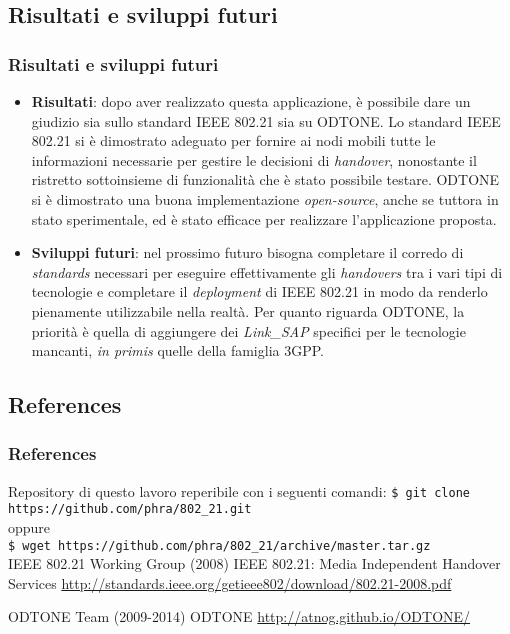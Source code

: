 \documentclass[10pt]{beamer}
\newcommand{\cmduser}[1]{\texttt{\$ #1}\\}
\begin{document}
\subsection{Risultati e sviluppi futuri}
\begin{frame}
\frametitle{Risultati e sviluppi futuri}
\begin{itemize}
\item \textbf{Risultati}: dopo aver realizzato questa applicazione, è possibile dare un giudizio sia sullo standard IEEE 802.21 sia su ODTONE. Lo standard IEEE 802.21 si è dimostrato adeguato per fornire ai nodi mobili tutte le informazioni necessarie per gestire le decisioni di {\em handover}, nonostante il ristretto sottoinsieme di funzionalità che è stato possibile testare. ODTONE si è dimostrato una buona implementazione {\em open-source}, anche se tuttora in stato sperimentale, ed è stato efficace per realizzare l'applicazione proposta. 
\item \textbf{Sviluppi futuri}: nel prossimo futuro bisogna completare il corredo di {\em standards} necessari per eseguire effettivamente gli {\em handovers} tra i vari tipi di tecnologie e completare il {\em deployment} di IEEE 802.21 in modo da renderlo pienamente utilizzabile nella realtà.
Per quanto riguarda ODTONE, la priorità è quella di aggiungere dei {\em Link\_SAP} specifici per le tecnologie mancanti, {\em in primis} quelle della famiglia 3GPP.
\end{itemize}
\end{frame}

\subsection{References}
\begin{frame}
\frametitle{References}
\footnotesize{
\begin{thebibliography}{99} %

 Repository di questo lavoro reperibile con i seguenti comandi:
\newblock \cmduser{git clone https://github.com/phra/802\_21.git}
oppure\\
\cmduser{wget https://github.com/phra/802\_21/archive/master.tar.gz}
\vspace{2em}
 IEEE 802.21 Working Group (2008)
\newblock IEEE 802.21: Media Independent Handover Services
\newblock \url{http://standards.ieee.org/getieee802/download/802.21-2008.pdf}

 ODTONE Team (2009-2014)
\newblock ODTONE
\newblock \url{http://atnog.github.io/ODTONE/}


\end{thebibliography}
}
\end{frame}
\end{document}
